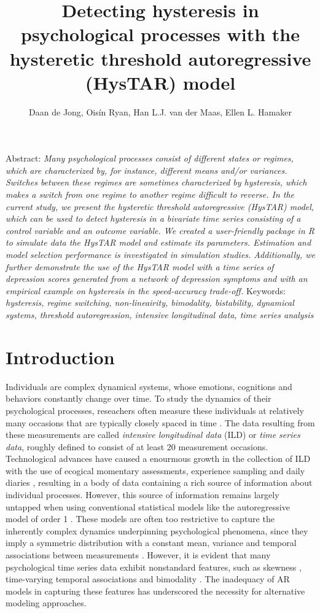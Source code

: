 \documentclass{article}
\title{Detecting hysteresis in psychological processes with the hysteretic threshold autoregressive (HysTAR) model}
\author{Daan de Jong, Ois\'{i}n Ryan, Han L.J. van der Maas, Ellen L. Hamaker}
\begin{document}
\maketitle

Abstract:
\textit{
Many psychological processes consist of different states or regimes, which are characterized by, for instance, different means and/or variances. 
Switches between these regimes are sometimes characterized by hysteresis, which makes a switch from one regime to another regime difficult to reverse. 
In the current study, we present the hysteretic threshold autoregressive (HysTAR) model, which can be used to detect hysteresis in a bivariate time series consisting of a control variable and an outcome variable. 
We created a user-friendly package in \textsf{R} to simulate data the HysTAR model and estimate its parameters. 
Estimation and model selection performance is investigated in simulation studies. 
Additionally, we further demonstrate the use of the HysTAR model with a time series of depression scores generated from a network of depression symptoms and with an empirical example on hysteresis in the speed-accuracy trade-off.
}
\newline
Keywords: \textit{hysteresis, regime switching, non-lineairity, bimodality, bistability, dynamical systems, threshold autoregression, intensive longitudinal data, time series analysis}

\section{Introduction}
Individuals are complex dynamical systems, whose emotions, cognitions and behaviors constantly change over time.
To study the dynamics of their psychological processes, reseachers often measure these individuals at relatively many occasions that are typically closely spaced in time \citep{bolger2013intensive, walls2006models}.
The data resulting from these measurements are called \textit{intensive longitudinal data} (ILD) or \textit{time series data}, roughly defined to consist of at least 20 measurement occasions.
Technological advances have caused a enourmous growth in the collection of ILD with the use of ecogical momentary assessments, experience sampling and daily diaries \citep{notimelikethepresent}, resulting in a body of data containing a rich source of information about individual processes.
However, this source of information remains largely untapped when using conventional statistical models like the autoregressive model of order 1 \citep[AR(1),][]{box_jenkins, chatfield}. These models are often too restrictive to capture the inherently complex dynamics underpinning psychological phenomena, since they imply a symmetric distribution with a constant mean, variance and temporal associations between measurements \citep{formal_theory_1, changing_inertia_2}.
However, it is evident that many psychological time series data exhibit nonstandard features, such as skewness \citep{skewness_oisin, skewness_2, skewness_3}, time-varying temporal associations \citep{changing_inertia_1, changing_inertia_2} and bimodality \citep{skewness_oisin, bimodality_han}.
The inadequacy of AR models in capturing these features has underscored the necessity for alternative modeling approaches.
\end{document}
